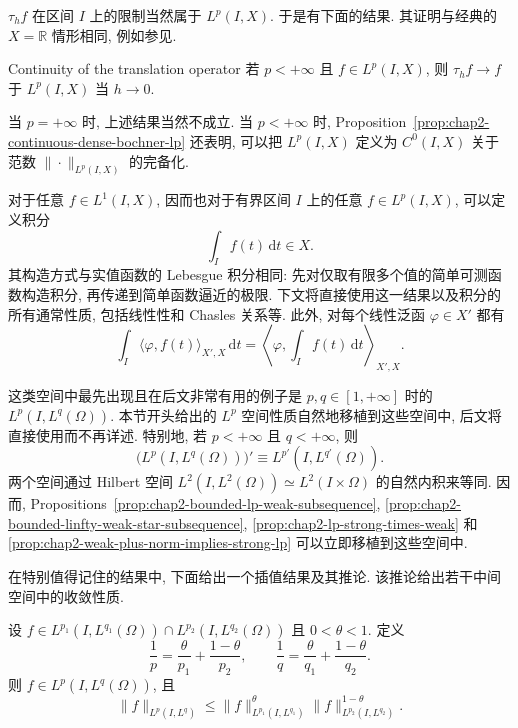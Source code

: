 $\tau_hf$ 在区间 $I$ 上的限制当然属于 $L^p(I,X)$. 于是有下面的结果. 其证明与经典的 $X=\mathbb{R}$ 情形相同, 例如参见.

\begin{Corollary}{Continuity of the translation operator}
\label{cor:chap2-banach-translation-continuity}
若 $p<+\infty$ 且 $f\in L^p(I,X)$, 则 $\tau_hf\to f$ 于 $L^p(I,X)$ 当 $h\to0$.
\end{Corollary}

当 $p=+\infty$ 时, 上述结果当然不成立. 当 $p<+\infty$ 时, Proposition~\ref{prop:chap2-continuous-dense-bochner-lp} 还表明, 可以把 $L^p(I,X)$ 定义为 $C^0(I,X)$ 关于范数 $\|\cdot\|_{L^p(I,X)}$ 的完备化.

对于任意 $f\in L^1(I,X)$, 因而也对于有界区间 $I$ 上的任意 $f\in L^p(I,X)$, 可以定义积分
\[
 \int_I f(t)\,\mathrm{d}t\in X.
\]
其构造方式与实值函数的 Lebesgue 积分相同: 先对仅取有限多个值的简单可测函数构造积分, 再传递到简单函数逼近的极限. 下文将直接使用这一结果以及积分的所有通常性质, 包括线性性和 Chasles 关系等. 此外, 对每个线性泛函 $\varphi\in X'$ 都有
\[
 \int_I\langle\varphi,f(t)\rangle_{X',X}\,\mathrm{d}t
 =\left\langle\varphi,\int_I f(t)\,\mathrm{d}t\right\rangle_{X',X}.
\]

这类空间中最先出现且在后文非常有用的例子是 $p,q\in[1,+\infty]$ 时的 $L^p(I,L^q(\Omega))$. 本节开头给出的 $L^p$ 空间性质自然地移植到这些空间中, 后文将直接使用而不再详述. 特别地, 若 $p<+\infty$ 且 $q<+\infty$, 则
\[
 \bigl(L^p(I,L^q(\Omega))\bigr)'
 \equiv L^{p'}(I,L^{q'}(\Omega)).
\]
两个空间通过 Hilbert 空间 $L^2(I,L^2(\Omega))\simeq L^2(I\times\Omega)$ 的自然内积来等同. 因而, Propositions~\ref{prop:chap2-bounded-lp-weak-subsequence}, \ref{prop:chap2-bounded-linfty-weak-star-subsequence}, \ref{prop:chap2-lp-strong-times-weak} 和 \ref{prop:chap2-weak-plus-norm-implies-strong-lp} 可以立即移植到这些空间中.

在特别值得记住的结果中, 下面给出一个插值结果及其推论. 该推论给出若干中间空间中的收敛性质.

\begin{Theorem}
\label{thm:chap2-mixed-lp-interpolation}
设 $f\in L^{p_1}(I,L^{q_1}(\Omega))\cap L^{p_2}(I,L^{q_2}(\Omega))$ 且 $0<\theta<1$. 定义
\begin{equation}
 \frac1p=\frac\theta{p_1}+\frac{1-\theta}{p_2},
 \qquad\frac1q=\frac\theta{q_1}+\frac{1-\theta}{q_2}.
 \label{eq:chap2-mixed-interpolation-exponents}
\end{equation}
则 $f\in L^p(I,L^q(\Omega))$, 且
\[
 \|f\|_{L^p(I,L^q)}
 \leq\|f\|_{L^{p_1}(I,L^{q_1})}^\theta
 \|f\|_{L^{p_2}(I,L^{q_2})}^{1-\theta}.
\]
\end{Theorem}

